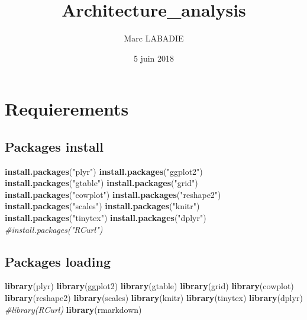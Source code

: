 \documentclass[]{article}
\title{Architecture\_analysis}
\author{Marc LABADIE}
\date{5 juin 2018}
\newenvironment{Shaded}{\begin{snugshade}}{\end{snugshade}}
\newcommand{\KeywordTok}[1]{\textcolor[rgb]{0.13,0.29,0.53}{\textbf{#1}}}
\newcommand{\StringTok}[1]{\textcolor[rgb]{0.31,0.60,0.02}{#1}}
\newcommand{\CommentTok}[1]{\textcolor[rgb]{0.56,0.35,0.01}{\textit{#1}}}
\newcommand{\NormalTok}[1]{#1}
\begin{document}
\maketitle

{
\setcounter{tocdepth}{4}
\tableofcontents
}
\section{Requierements}\label{requierements}

\subsection{Packages install}\label{packages-install}

\begin{Shaded}
\begin{Highlighting}[]
\KeywordTok{install.packages}\NormalTok{(}\StringTok{"plyr"}\NormalTok{)}
\KeywordTok{install.packages}\NormalTok{(}\StringTok{"ggplot2"}\NormalTok{)}
\KeywordTok{install.packages}\NormalTok{(}\StringTok{"gtable"}\NormalTok{)}
\KeywordTok{install.packages}\NormalTok{(}\StringTok{"grid"}\NormalTok{)}
\KeywordTok{install.packages}\NormalTok{(}\StringTok{"cowplot"}\NormalTok{)}
\KeywordTok{install.packages}\NormalTok{(}\StringTok{"reshape2"}\NormalTok{)}
\KeywordTok{install.packages}\NormalTok{(}\StringTok{"scales"}\NormalTok{)}
\KeywordTok{install.packages}\NormalTok{(}\StringTok{"knitr"}\NormalTok{)}
\KeywordTok{install.packages}\NormalTok{(}\StringTok{"tinytex"}\NormalTok{)}
\KeywordTok{install.packages}\NormalTok{(}\StringTok{"dplyr"}\NormalTok{)}
\CommentTok{#install.packages("RCurl")}
\end{Highlighting}
\end{Shaded}

\subsection{Packages loading}\label{packages-loading}

\begin{Shaded}
\begin{Highlighting}[]
\KeywordTok{library}\NormalTok{(plyr)}
\KeywordTok{library}\NormalTok{(ggplot2)}
\KeywordTok{library}\NormalTok{(gtable)}
\KeywordTok{library}\NormalTok{(grid)}
\KeywordTok{library}\NormalTok{(cowplot)}
\KeywordTok{library}\NormalTok{(reshape2)}
\KeywordTok{library}\NormalTok{(scales)}
\KeywordTok{library}\NormalTok{(knitr)}
\KeywordTok{library}\NormalTok{(tinytex)}
\KeywordTok{library}\NormalTok{(dplyr)}
\CommentTok{#library(RCurl)}
\KeywordTok{library}\NormalTok{(rmarkdown)}
\end{Highlighting}
\end{Shaded}
\end{document}
